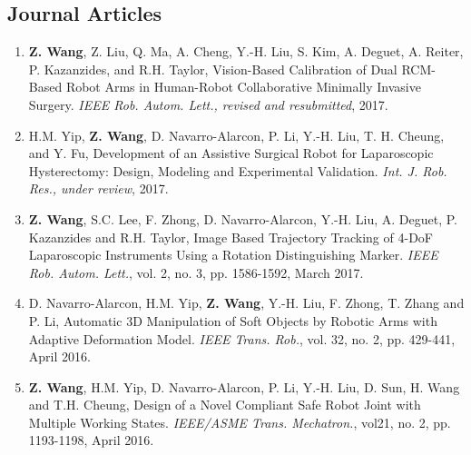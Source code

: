 \documentclass[10pt,letterpaper]{article}
\begin{document}
    \subsection*{Journal Articles}
    \begin{enumerate}
        \item \textbf{Z. Wang}, Z. Liu, Q. Ma, A. Cheng, Y.-H. Liu, S. Kim, A. Deguet, A. Reiter, P. Kazanzides, and R.H. Taylor,
        Vision-Based Calibration of Dual RCM-Based Robot Arms in Human-Robot Collaborative Minimally Invasive Surgery.
        \textit{IEEE Rob. Autom. Lett., revised and resubmitted}, 2017.
        \item H.M. Yip, \textbf{Z. Wang}, D. Navarro-Alarcon, P. Li, Y.-H. Liu, T. H. Cheung, and Y. Fu,
        Development of an Assistive Surgical Robot for Laparoscopic Hysterectomy: Design, Modeling and Experimental Validation.
        \textit{Int. J. Rob. Res., under review}, 2017.
        \item \textbf{Z. Wang}, S.C. Lee, F. Zhong, D. Navarro-Alarcon, Y.-H. Liu, A. Deguet, P. Kazanzides and R.H. Taylor,
        Image Based Trajectory Tracking of 4-DoF Laparoscopic Instruments Using a Rotation Distinguishing Marker.
        \textit{IEEE Rob. Autom. Lett.}, vol. 2, no. 3, pp. 1586-1592, March 2017.
        \item D. Navarro-Alarcon, H.M. Yip, \textbf{Z. Wang}, Y.-H. Liu, F. Zhong, T. Zhang and P. Li,
        Automatic 3D Manipulation of Soft Objects by Robotic Arms with Adaptive Deformation Model.
        \textit{{IEEE} Trans. Rob.}, vol. 32, no. 2, pp. 429-441, April 2016.
        \item \textbf{Z. Wang}, H.M. Yip, D. Navarro-Alarcon, P. Li, Y.-H. Liu, D. Sun, H. Wang and T.H. Cheung,
        Design of a Novel Compliant Safe Robot Joint with Multiple Working States.
        \textit{{IEEE/ASME} Trans. Mechatron.}, vol21, no. 2, pp. 1193-1198, April 2016.
    \end{enumerate}
\end{document}
